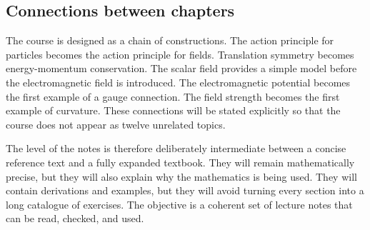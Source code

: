 \subsection*{Connections between chapters}

The course is designed as a chain of constructions. The action principle for particles becomes the action principle for fields. Translation symmetry becomes energy-momentum conservation. The scalar field provides a simple model before the electromagnetic field is introduced. The electromagnetic potential becomes the first example of a gauge connection. The field strength becomes the first example of curvature. These connections will be stated explicitly so that the course does not appear as twelve unrelated topics.

The level of the notes is therefore deliberately intermediate between a concise reference text and a fully expanded textbook. They will remain mathematically precise, but they will also explain why the mathematics is being used. They will contain derivations and examples, but they will avoid turning every section into a long catalogue of exercises. The objective is a coherent set of lecture notes that can be read, checked, and used.
